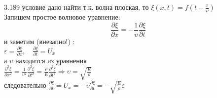 \testCom
{%
	3.189
}
{%
	условие
}
{%
	дано
}
{%
	найти
}
{%
	т.к. волна плоская, то  $\xi (x, t) = f (t - \frac{x}{\upsilon})$\\
	Запишем простое волновое уравнение:\\
	\[ \frac{\partial \xi}{\partial x} = - \frac{1}{\upsilon} \frac{\partial \xi}{\partial t}\]
	и заметим (внезапно!) :\\
	$\varepsilon = \frac{\partial \xi}{\partial x}, \quad \frac{\partial \xi}{\partial t} = U_x$\\
	а $\upsilon$ находится из уравнения\\
	$\frac{\partial^2 \xi}{\partial x^2} = \frac{1}{\upsilon^2} \frac{\partial^2 \xi}{\partial t^2} = \frac{\rho}{E} \frac{\partial^2 \xi}{\partial t^2} \Rightarrow \upsilon = \sqrt{\frac{E}{\rho}}$\\
	следовательно $\frac{\partial \xi}{\partial t} = U_x = - \upsilon \frac{\partial \xi}{\partial t} = - \sqrt{\frac{E}{\rho}} \varepsilon $\\
}

